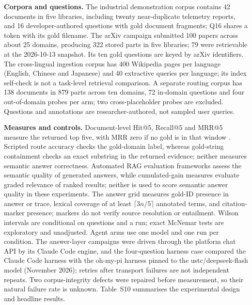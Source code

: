 \textbf{Corpora and questions.} The industrial demonstration corpus contains
42 documents in five libraries, including twenty near-duplicate telemetry
reports, and 16 developer-authored questions with gold document fragments; Q16
shares a token with its gold filename. The arXiv campaign submitted 100 papers
across about 25 domains, producing 322 stored parts in five libraries; 79 were
retrievable at the 2026-10-13 snapshot. Its ten gold questions are keyed by
arXiv identifiers. The cross-lingual ingestion corpus has 400 Wikipedia pages
per language (English, Chinese and Japanese) and 40 extractive queries per
language; its index self-check is not a task-level retrieval comparison. A
separate routing corpus has 138 documents in 879 parts across ten domains,
72 in-domain questions and four out-of-domain probes per arm; two
cross-placeholder probes are excluded. Questions and annotations are
researcher-authored, not sampled user queries.

\textbf{Measures and controls.} Document-level Hit@5, Recall@5 and MRR@5
measure the returned top five, with MRR zero if no gold is in that window
\cite{craswell-msmarco-2021}. Scripted route accuracy checks the gold-domain
label, whereas gold-string containment checks an exact substring in the
returned evidence; neither measures semantic answer correctness. Automated
RAG evaluation frameworks \citep{es-ragas-2024,saad-falcon-ares-2024}
assess the semantic quality of generated answers, while cumulated-gain
measures \citep{jarvelin-cumulated-gain-2002} evaluate graded relevance of
ranked results; neither is used to score semantic answer quality in these
experiments. The answer grid measures gold-ID presence in answer or trace,
lexical coverage of at
least $\lceil3n/5\rceil$ annotated terms, and citation-marker presence;
markers do not verify source resolution or entailment. Wilson intervals are
conditional on questions and a run; exact McNemar tests are exploratory and
unadjusted. Agent arms use one model and one run per condition. The
answer-layer campaigns were driven through the platform chat API by its
Claude Code engine, and the four-question harness case compared the Claude
Code harness with the oh-my-pi harness pinned to the ustc/deepseek-flash
model (November 2026); retries after transport failures are not independent
repeats. Two corpus-integrity defects
were repaired before measurement, so their natural failure rate is unknown.
Table~S10 summarises the experimental design and headline results.

